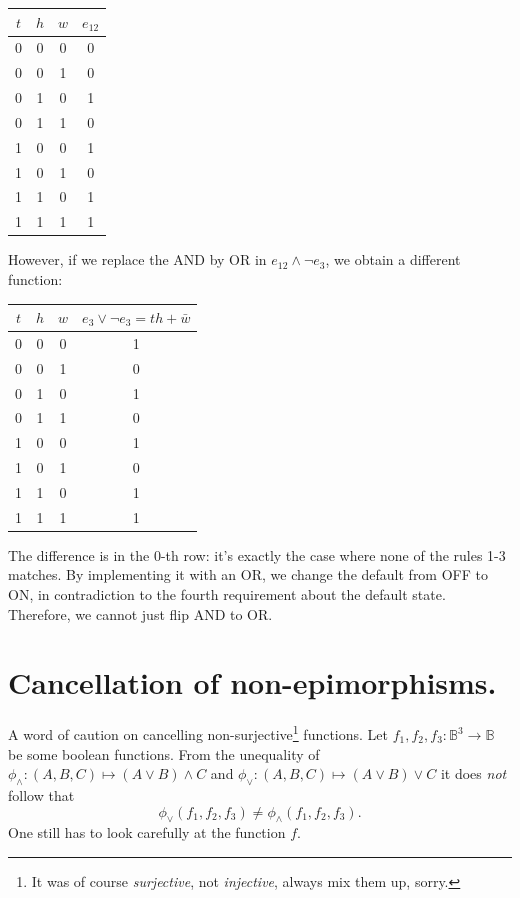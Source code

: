 \documentclass[10pt,a4paper]{scrartcl}
\begin{document}
\vspace{0.5 em}
\begin{tabular}{|ccc|c|}
\hline
$t$ & $h$ & $w$ & $e_{12}$ \\
\hline
0 & 0 & 0 & 0 \\ 
0 & 0 & 1 & 0 \\ 
0 & 1 & 0 & 1 \\  
0 & 1 & 1 & 0 \\ 
1 & 0 & 0 & 1 \\ 
1 & 0 & 1 & 0 \\ 
1 & 1 & 0 & 1 \\ 
1 & 1 & 1 & 1 \\ 
\hline
\end{tabular}

However, if we replace the AND by OR in $e_{12} \wedge \neg e_3$, we obtain a different function:

\vspace{0.5 em}
\begin{tabular}{|ccc|c|}
\hline
$t$ & $h$ & $w$ & $e_3\vee \neg e_3 = th + \bar w$ \\
\hline
0 & 0 & 0 & 1 \\ 
0 & 0 & 1 & 0 \\ 
0 & 1 & 0 & 1 \\  
0 & 1 & 1 & 0 \\ 
1 & 0 & 0 & 1 \\ 
1 & 0 & 1 & 0 \\ 
1 & 1 & 0 & 1 \\ 
1 & 1 & 1 & 1 \\ 
\hline
\end{tabular}

The difference is in the $0$-th row: it's exactly the case where none of the rules 1-3 matches.
By implementing it with an OR, we change the default from OFF to ON, in contradiction to the
fourth requirement about the default state. Therefore, we cannot just flip AND to OR.

\section*{Cancellation of non-epimorphisms.}
A word of caution on cancelling non-surjective\footnote{It was of course \emph{surjective}, not \emph{injective}, always mix them up, sorry.} functions. 
Let $f_1, f_2, f_3: \mathbb{B}^3 \to \mathbb{B}$ be some boolean functions. 
From the unequality of $\phi_\wedge: (A,B,C) \mapsto (A \vee B) \wedge C$ and 
$\phi_\vee: (A,B,C) \mapsto (A \vee B) \vee C$ it does \emph{not} follow that 
\[
  \phi_\vee(f_1, f_2, f_3) \neq \phi_\wedge(f_1, f_2, f_3).
\]
One still has to look carefully at the function $f$.
\end{document}
